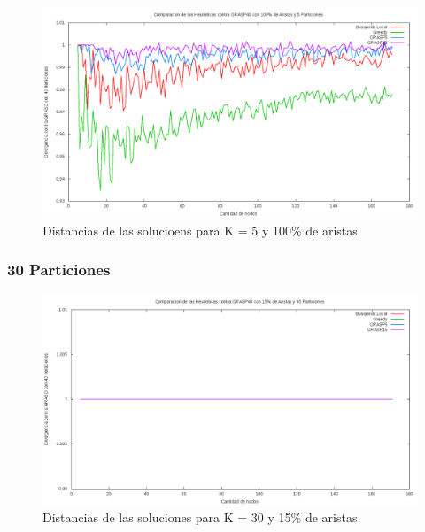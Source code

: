 \begin{figure}[H]
\begin{center}
\includegraphics[scale=0.4]{finales/muchosComparacionesCon5Particiones100Aristas.png}
\caption{Distancias de las solucioens para K = 5 y 100\% de aristas}
\end{center}
\end{figure}

\subsubsection{30 Particiones}

\begin{figure}[H]
\begin{center}
\includegraphics[scale=0.4]{finales/muchosComparacionesCon30Particiones15Aristas.png}
\caption{Distancias de las soluciones para K = 30 y 15\% de aristas}
\end{center}
\end{figure}

